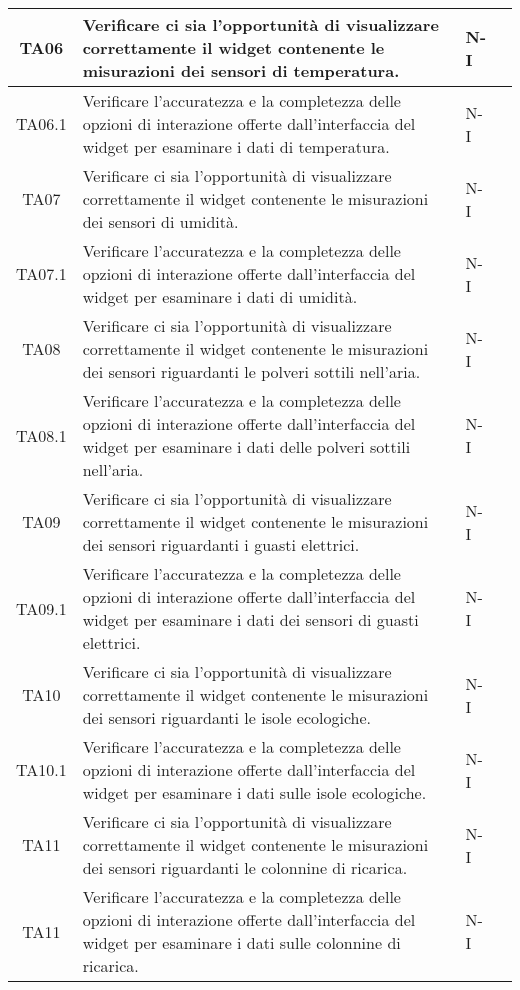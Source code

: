 \begin{longtable}{|c|p{5cm}|p{2cm}|c|}
    \hline
    TA06 & Verificare ci sia l'opportunità di visualizzare correttamente il widget contenente le misurazioni dei sensori di temperatura. & N-I \\
    \hline
    TA06.1 & Verificare l'accuratezza e la completezza delle opzioni di interazione offerte dall'interfaccia del widget per esaminare i dati di temperatura. & N-I \\
    \hline
    TA07 & Verificare ci sia l'opportunità di visualizzare correttamente il widget contenente le misurazioni dei sensori di umidità. & N-I \\
    \hline
    TA07.1 & Verificare l'accuratezza e la completezza delle opzioni di interazione offerte dall'interfaccia del widget per esaminare i dati di umidità. & N-I \\
    \hline
    TA08 & Verificare ci sia l'opportunità di visualizzare correttamente il widget contenente le misurazioni dei sensori riguardanti le polveri sottili nell'aria. & N-I \\
    \hline
    TA08.1 & Verificare l'accuratezza e la completezza delle opzioni di interazione offerte dall'interfaccia del widget per esaminare i dati delle polveri sottili nell'aria. & N-I \\
    \hline
    TA09 & Verificare ci sia l'opportunità di visualizzare correttamente il widget contenente le misurazioni dei sensori riguardanti i guasti elettrici. & N-I \\
    \hline
    TA09.1 & Verificare l'accuratezza e la completezza delle opzioni di interazione offerte dall'interfaccia del widget per esaminare i dati dei sensori di guasti elettrici. & N-I \\
    \hline
    TA10 & Verificare ci sia l'opportunità di visualizzare correttamente il widget contenente le misurazioni dei sensori riguardanti le isole ecologiche. & N-I \\
    \hline
    TA10.1 & Verificare l'accuratezza e la completezza delle opzioni di interazione offerte dall'interfaccia del widget per esaminare i dati sulle isole ecologiche. & N-I \\
    \hline
    TA11 & Verificare ci sia l'opportunità di visualizzare correttamente il widget contenente le misurazioni dei sensori riguardanti le colonnine di ricarica. & N-I \\
    \hline
    TA11 & Verificare l'accuratezza e la completezza delle opzioni di interazione offerte dall'interfaccia del widget per esaminare i dati sulle colonnine di ricarica. & N-I \\

\end{longtable}
